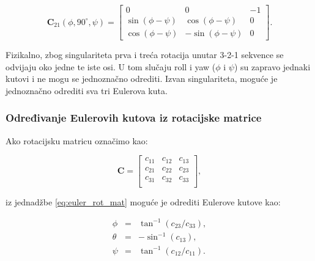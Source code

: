 \documentclass[times, utf8, diplomski, numeric]{templates/template}
\begin{document}
{{{{                \begin{equation}
                \textbf{C}_{21}(\phi, 90^{\circ}, \psi) =
                \begin{bmatrix}
                    0                 & 0                  & -1 \\
                    \sin(\phi - \psi) & \cos(\phi - \psi)  &  0 \\
                    \cos(\phi - \psi) & -\sin(\phi - \psi) &  0
                \end{bmatrix}
                .
                \end{equation}

                Fizikalno, zbog singulariteta prva i treća rotacija unutar 3-2-1 sekvence se odvijaju oko jedne te iste osi. U tom slučaju roll i yaw ($\phi$ i $\psi$) su zapravo jednaki kutovi i ne mogu se jednoznačno odrediti. Izvan singulariteta, moguće je jednoznačno odrediti sva tri Eulerova kuta. 
            }

            \subsubsection{Određivanje Eulerovih kutova iz rotacijske matrice}{
                Ako rotacijsku matricu označimo kao:

                \begin{equation}
                \label{eq:rotation_matrix}
                \textbf{C} =
                \begin{bmatrix}
                    c_{11} & c_{12} & c_{13} \\
                    c_{21} & c_{22} & c_{23} \\
                    c_{31} & c_{32} & c_{33} \\
                \end{bmatrix}
                ,
                \end{equation}

                iz jednadžbe \ref{eq:euler_rot_mat} moguće je odrediti Eulerove kutove kao:

                \begin{equation}
                \begin{array}{rcl}
                    \phi   & = & \tan^{-1}(c_{23}/c_{33}),\\
                    \theta & = & -\sin^{-1}(c_{13}),\\
                    \psi   & = & \tan^{-1}(c_{12}/c_{11}).
                \end{array}
                \end{equation}
            }

}}}
\end{document}
